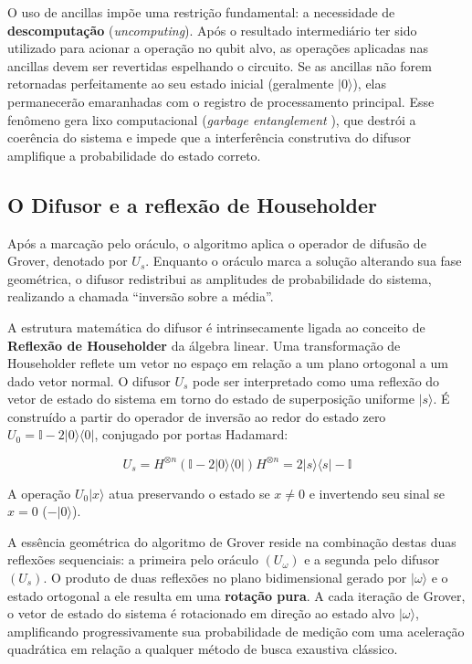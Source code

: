 \documentclass[12pt, a4paper]{article}
\newcommand{\ket}[1]{\lvert #1 \rangle}
\newcommand{\bra}[1]{\langle #1 \rvert}
\begin{document}
O uso de ancillas impõe uma restrição fundamental: a necessidade de \textbf{descomputação} (\textit{uncomputing}). Após o resultado intermediário ter sido utilizado para acionar a operação no qubit alvo, as operações aplicadas nas ancillas devem ser revertidas espelhando o circuito. Se as ancillas não forem retornadas perfeitamente ao seu estado inicial (geralmente $\ket{0}$), elas permanecerão emaranhadas com o registro de processamento principal. Esse fenômeno gera lixo computacional (\textit{garbage entanglement} \cite{nielsen2010}), que destrói a coerência do sistema e impede que a interferência construtiva do difusor amplifique a probabilidade do estado correto.

\subsection{O Difusor e a reflexão de Householder}

Após a marcação pelo oráculo, o algoritmo aplica o operador de difusão de Grover, denotado por $U_s$. Enquanto o oráculo marca a solução alterando sua fase geométrica, o difusor redistribui as amplitudes de probabilidade do sistema, realizando a chamada ``inversão sobre a média''.

A estrutura matemática do difusor é intrinsecamente ligada ao conceito de \textbf{Reflexão de Householder} da álgebra linear. Uma transformação de Householder reflete um vetor no espaço em relação a um plano ortogonal a um dado vetor normal. O difusor $U_s$ pode ser interpretado como uma reflexão do vetor de estado do sistema em torno do estado de superposição uniforme $\ket{s}$. É construído a partir do operador de inversão ao redor do estado zero $U_0 = \mathbb{I} - 2\ket{0}\bra{0}$, conjugado por portas Hadamard:

\begin{equation}
    U_s = H^{\otimes n} (\mathbb{I} - 2\ket{0}\bra{0}) H^{\otimes n} = 2\ket{s}\bra{s} - \mathbb{I}
\end{equation}

A operação $U_0 \ket{x}$ atua preservando o estado se $x \neq 0$ e invertendo seu sinal se $x = 0$ ($-\ket{0}$). 

A essência geométrica do algoritmo de Grover reside na combinação destas duas reflexões sequenciais: a primeira pelo oráculo $(U_\omega)$ e a segunda pelo difusor $(U_s)$. O produto de duas reflexões no plano bidimensional gerado por $\ket{\omega}$ e o estado ortogonal a ele resulta em uma \textbf{rotação pura}. A cada iteração de Grover, o vetor de estado do sistema é rotacionado em direção ao estado alvo $\ket{\omega}$, amplificando progressivamente sua probabilidade de medição com uma aceleração quadrática em relação a qualquer método de busca exaustiva clássico.
\end{document}
